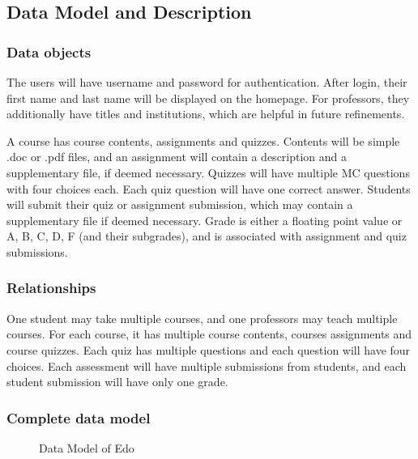 \documentclass[paper=a4, fontsize=11pt]{scrartcl}
\numberwithin{equation}{section}		%
\numberwithin{figure}{section}			%
\numberwithin{table}{section}				%
\begin{document}
\begin{itemize}
\end{itemize}



\subsection{Data Model and Description}

\subsubsection{Data objects}
The users will have username and password for authentication. After login, their first name and last name will be displayed on the homepage. For professors, they additionally have titles and institutions, which are helpful in future refinements.

A course has course contents, assignments and quizzes. Contents will be simple .doc or .pdf files, and an assignment will contain a description and a supplementary file, if deemed necessary. Quizzes will have multiple MC questions with four choices each. Each quiz question will have one correct answer. Students will submit their quiz or assignment submission, which may contain a supplementary file if deemed necessary. Grade is either a floating point value or A, B, C, D, F (and their subgrades), and is associated with assignment and quiz submissions.

\subsubsection{Relationships}
One student may take multiple courses, and one professors may teach multiple courses. For each course, it has multiple course contents, courses assignments and course quizzes. Each quiz has multiple questions and each question will have four choices. Each assessment will have multiple submissions from students, and each student submission will have only one grade. 

\subsubsection{Complete data model}
\begin{figure}[!ht]
	\begin{center}
	\end{center}
	\caption{Data Model of Edo}
\end{figure}
\end{document}
